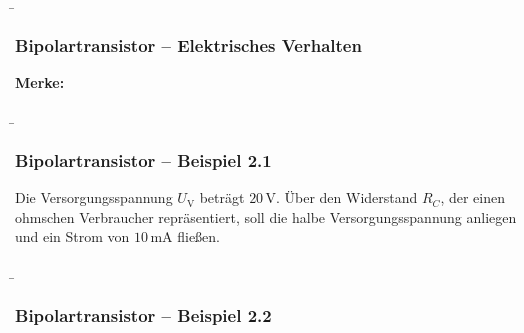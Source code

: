 \begin{frame}
    \b{\frametitle{Bipolartransistor -- Elektrisches Verhalten}
        \textbf{Merke:}
        \begin{itemize}
        \end{itemize}
        }
\end{frame}

\begin{frame}
    \b{ \frametitle{Bipolartransistor -- Beispiel 2.1}
            Die Versorgungsspannung $U_\mathrm{V}$ beträgt $20\,\mathrm{V}$. Über den Widerstand $R_C$, 
            der einen ohmschen Verbraucher repräsentiert, soll die halbe Versorgungsspannung anliegen und ein Strom von $10\,\mathrm{mA}$ fließen.
            
            \begin{figure}[H]
                \centering
            \begin{minipage}[b]{0.48\textwidth}
                \raggedright
                \scalebox{0.5}{ }
            \end{minipage}
            \begin{minipage}[b]{0.48\textwidth}
                \raggedleft
                \scalebox{0.8}{}
            \end{minipage}
                
            \end{figure}
    }
\end{frame}

\begin{frame}
    \b{ \frametitle{Bipolartransistor -- Beispiel 2.2}
      \begin{figure}[H]
            \centering
            
        \end{figure}
    }
\end{frame}

